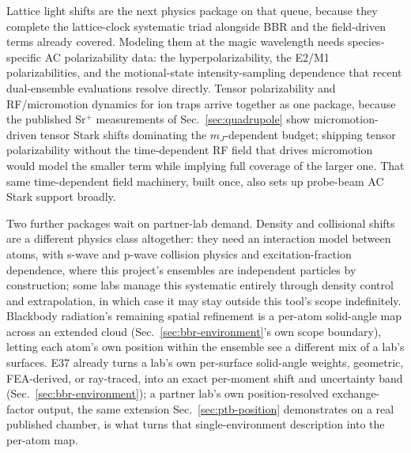 \documentclass[aps,pra,superscriptaddress,groupedaddress,nofootinbib]{revtex4-2}
\begin{document}
Lattice light shifts are the next physics package on that queue,
because they complete the lattice-clock systematic triad alongside BBR
and the field-driven terms already covered. Modeling them at the magic
wavelength needs species-specific AC polarizability data: the
hyperpolarizability, the E2/M1 polarizabilities, and the
motional-state intensity-sampling dependence that recent dual-ensemble
evaluations resolve directly. Tensor polarizability and RF/micromotion
dynamics for ion traps arrive together as one package, because the
published Sr$^+$ measurements of Sec.~\ref{sec:quadrupole}
\cite{Dube2005} show
micromotion-driven tensor Stark shifts dominating the
$m_J$-dependent budget; shipping tensor polarizability without the
time-dependent RF field that drives micromotion would model the
smaller term while implying full coverage of the larger one. That same
time-dependent field machinery, built once, also sets up probe-beam AC
Stark support broadly.

Two further packages wait on partner-lab demand. Density and
collisional shifts are a different physics class altogether: they need
an interaction model between atoms, with s-wave and p-wave collision
physics and excitation-fraction dependence, where this project's
ensembles are independent particles by construction; some labs manage
this systematic entirely through density control and extrapolation, in
which case it may stay outside this tool's scope indefinitely.
Blackbody radiation's remaining spatial refinement is a per-atom solid-angle
map across an extended cloud (Sec.~\ref{sec:bbr-environment}'s own scope
boundary), letting each atom's own position within the ensemble see a
different mix of a lab's surfaces. E37 already turns a lab's own per-surface
solid-angle weights, geometric, FEA-derived, or ray-traced, into an exact
per-moment shift and uncertainty band (Sec.~\ref{sec:bbr-environment}); a
partner lab's own position-resolved exchange-factor output, the same
extension Sec.~\ref{sec:ptb-position} demonstrates on a real published
chamber, is what turns that single-environment description into the
per-atom map.
\end{document}
